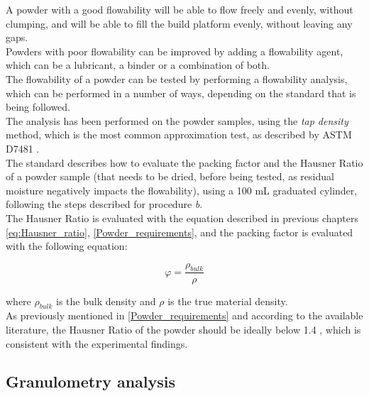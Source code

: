 \documentclass{article}
\begin{document}
        A powder with a good flowability will be able to flow freely and evenly, without clumping, and will be able to fill the 
        build platform evenly, without leaving any gaps. \\ 

        Powders with poor flowability can be improved by adding a flowability agent, which can be a lubricant, a binder or a 
        combination of both. \\ 

        The flowability of a powder can be tested by performing a flowability analysis, which can be performed in a number of ways, 
        depending on the standard that is being followed. \\

        The analysis has been performed on the powder samples, using the \textit{tap density} method, which is the most common 
        approximation test, as described by ASTM D7481 \autocites{ASTM_D7481-18}. \\

        The standard describes how to evaluate the packing factor and the Hausner Ratio of a powder sample (that needs to be 
        dried, before being tested, as residual moisture negatively impacts the flowability), 
        using a 100 mL graduated cylinder, following the steps described for procedure \textit{b}. \\

        The Hausner Ratio is evaluated with the equation described in previous chapters \ref{eq:Hausner_ratio}, \ref{Powder_requirements}, 
        and the packing factor is evaluated with the following equation: 

            \begin{equation}
                \varphi  = \frac{\rho_{bulk}}{\rho}
                \label{eq:packing_factor}
            \end{equation}

        where $\rho_{bulk}$ is the bulk density and $\rho$ is the true material density. \\

        As previously mentioned in \ref{Powder_requirements} and according to the available literature, the Hausner Ratio of the powder should 
        be ideally below 1.4 \autocites{doi:10.1063/1.4918516}, which is consistent with the experimental findings. \\  

        \clearpage

        \subsection{Granulometry analysis\label{granulometry_analysis}}
\end{document}
